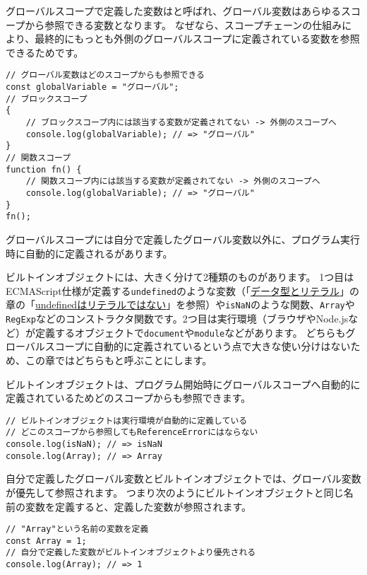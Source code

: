 グローバルスコープで定義した変数は\textbf{}と呼ばれ、グローバル変数はあらゆるスコープから参照できる変数となります。
なぜなら、スコープチェーンの仕組みにより、最終的にもっとも外側のグローバルスコープに定義されている変数を参照できるためです。

\begin{lstlisting}
// グローバル変数はどのスコープからも参照できる
const globalVariable = "グローバル";
// ブロックスコープ
{   
    // ブロックスコープ内には該当する変数が定義されてない -> 外側のスコープへ
    console.log(globalVariable); // => "グローバル"
}
// 関数スコープ
function fn() {
    // 関数スコープ内には該当する変数が定義されてない -> 外側のスコープへ
    console.log(globalVariable); // => "グローバル"
}
fn();
\end{lstlisting}

グローバルスコープには自分で定義したグローバル変数以外に、プログラム実行時に自動的に定義される\textbf{}があります。

ビルトインオブジェクトには、大きく分けて2種類のものがあります。
1つ目はECMAScript仕様が定義する\texttt{undefined}のような変数（「\hyperlink{data-type-and-literal}{データ型とリテラル}」の章の「\hyperlink{undefined-is-not-literal}{undefinedはリテラルではない}」を参照）や\texttt{isNaN}のような関数、\texttt{Array}や\texttt{RegExp}などのコンストラクタ関数です。2つ目は実行環境（ブラウザやNode.jsなど）が定義するオブジェクトで\texttt{document}や\texttt{module}などがあります。
どちらもグローバルスコープに自動的に定義されているという点で大きな使い分けはないため、この章ではどちらも\textbf{}と呼ぶことにします。

ビルトインオブジェクトは、プログラム開始時にグローバルスコープへ自動的に定義されているためどのスコープからも参照できます。

\begin{lstlisting}
// ビルトインオブジェクトは実行環境が自動的に定義している
// どこのスコープから参照してもReferenceErrorにはならない
console.log(isNaN); // => isNaN
console.log(Array); // => Array
\end{lstlisting}

自分で定義したグローバル変数とビルトインオブジェクトでは、グローバル変数が優先して参照されます。
つまり次のようにビルトインオブジェクトと同じ名前の変数を定義すると、定義した変数が参照されます。

\begin{lstlisting}
// "Array"という名前の変数を定義
const Array = 1;
// 自分で定義した変数がビルトインオブジェクトより優先される
console.log(Array); // => 1
\end{lstlisting}

